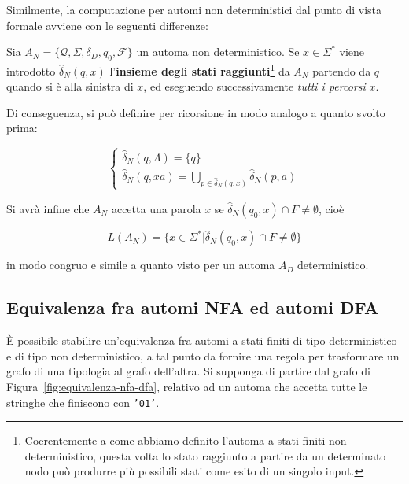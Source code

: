 \documentclass[10pt]{\classname}
\theoremstyle{newlinethm}
\theoremstyle{theorem}
\theoremstyle{definition}
\theoremstyle{definition}
\theoremstyle{definition}
\theoremstyle{definition}
\begin{document}
Similmente, la computazione per automi non deterministici dal punto di vista
formale avviene con le seguenti differenze:

Sia $A_N = \{ \mathcal Q, \Sigma, \delta_D, q_0, \mathcal F\}$ un automa non
deterministico. Se $x\in \Sigma^*$ viene introdotto $\hat{\delta}_N (q, x)$
l'\textbf{insieme degli stati raggiunti}\footnote{Coerentemente a come abbiamo
definito l'automa a stati finiti non deterministico, questa volta lo stato
raggiunto a partire da un determinato nodo può produrre più possibili stati
come esito di un singolo input.} da $A_N$ partendo da $q$ quando si è alla
sinistra di $x$, ed eseguendo successivamente \emph{tutti i percorsi} $x$.

Di conseguenza, si può definire per ricorsione in modo analogo a quanto svolto prima:

$$
\left\{
    \begin{array}{l}
        \hat{\delta}_N (q, \Lambda) = \{q\} \\
        \hat{\delta}_N (q, xa) = \displaystyle \bigcup_{p \in \hat{\delta}_N(q, x)} \hat{\delta}_N (p, a)
    \end{array}
\right.
$$

Si avrà infine che $A_N$ accetta una parola $x$ se $\hat{\delta}_N(q_0, x) \cap F
\neq \emptyset$, cioè

$$L(A_N) = \{x \in \Sigma^* | \hat{\delta}_N(q_0, x) \cap F \neq \emptyset \}$$

in modo congruo e simile a quanto visto per un automa $A_D$ deterministico.

\subsection{Equivalenza fra automi NFA ed automi DFA}

È possibile stabilire un'equivalenza fra automi a stati finiti di tipo
deterministico e di tipo non deterministico, a tal punto da fornire una regola
per trasformare un grafo di una tipologia al grafo dell'altra. Si supponga di
partire dal grafo di Figura~\ref{fig:equivalenza-nfa-dfa}, relativo ad un
automa che accetta tutte le stringhe che finiscono con \texttt{'01'}.
\end{document}
